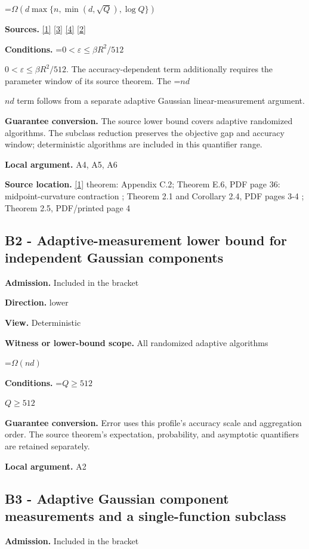 \documentclass[10pt,a4paper]{article}
\newcommand{\AtlasMath}[1]{\par\begingroup\centering\setbox0=\hbox{$\displaystyle #1$}\ifdim\wd0>1.4\linewidth\typeout{ATLAS WIDE FORMULA: \the\wd0}\fi\ifdim\wd0>\linewidth\resizebox{\linewidth}{!}{\box0}\else\box0\fi\par\endgroup}
\newcommand{\AtlasInlineMath}[1]{\begingroup\setbox0=\hbox{$#1$}\ifdim\wd0>.4\linewidth\endgroup\AtlasMath{#1}\else\endgroup$#1$\fi}
\begin{document}
\AtlasMath{\Omega\!\left(d\max\{n,\min(d,\sqrt Q),\log Q\}\right)}
\textbf{Sources.} \href{https://arxiv.org/html/2610.00345v1}{[1]} \href{https://arxiv.org/html/2607.16558v2}{[3]} \href{https://www.mathnet.ru/php/archive.phtml?jrnid=mzm&option_lang=eng&paperid=1697&wshow=paper}{[4]} \href{https://arxiv.org/abs/2109.08858}{[2]}

\textbf{Conditions.} \AtlasInlineMath{0<\varepsilon\le\beta R^2/512}. The accuracy-dependent term additionally requires the parameter window of its source theorem. The \AtlasInlineMath{nd} term follows from a separate adaptive Gaussian linear-measurement argument.

\textbf{Guarantee conversion.} The source lower bound covers adaptive randomized algorithms. The subclass reduction preserves the objective gap and accuracy window; deterministic algorithms are included in this quantifier range.

\textbf{Local argument.} A4, A5, A6

\textbf{Source location.} \href{https://arxiv.org/html/2610.00345v1}{[1]} theorem: Appendix C.2; Theorem E.6, PDF page 36: midpoint-curvature contraction ; Theorem 2.1 and Corollary 2.4, PDF pages 3-4 ; Theorem 2.5, PDF/printed page 4

\subsection{B2 - Adaptive-measurement lower bound for independent Gaussian components}
\textbf{Admission.} Included in the bracket

\textbf{Direction.} lower

\textbf{View.} Deterministic

\textbf{Witness or lower-bound scope.} All randomized adaptive algorithms

\AtlasMath{\Omega(nd)}
\textbf{Conditions.} \AtlasInlineMath{Q\ge512}

\textbf{Guarantee conversion.} Error uses this profile's accuracy scale and aggregation order. The source theorem's expectation, probability, and asymptotic quantifiers are retained separately.

\textbf{Local argument.} A2

\subsection{B3 - Adaptive Gaussian component measurements and a single-function subclass}
\textbf{Admission.} Included in the bracket
\end{document}
